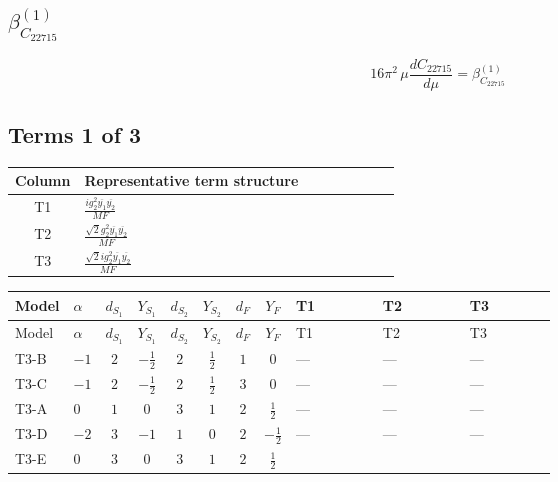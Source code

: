 \documentclass[8pt]{article}
\begin{document}
\begin{landscape}
\section*{$\beta_{C_{22715}}^{(1)}$}
\[16\pi^2\,\mu\frac{d C_{22715}}{d\mu}=\beta_{C_{22715}}^{(1)}\]
\subsection*{Terms 1 of 3}
\begin{center}
\begin{tabular}{@{}c >{\raggedright\arraybackslash}p{0.82\linewidth}@{}}
\toprule
Column & Representative term structure \\
\midrule
T1 & \(\displaystyle \frac{i g_{2}^{2} \overline{y_{1}} \overline{y_{2}}}{MF}\) \\
\midrule
T2 & \(\displaystyle \frac{\sqrt{2} g_{2}^{2} \overline{y_{1}} \overline{y_{2}}}{MF}\) \\
\midrule
T3 & \(\displaystyle \frac{\sqrt{2} i g_{2}^{2} \overline{y_{1}} \overline{y_{2}}}{MF}\) \\
\midrule
\bottomrule
\end{tabular}
\end{center}
\smallskip
\tiny
\begin{longtable}{@{}llcccccc >{\raggedright\arraybackslash}p{0.21\linewidth} >{\raggedright\arraybackslash}p{0.21\linewidth} >{\raggedright\arraybackslash}p{0.21\linewidth}@{}}
\toprule
Model & $\alpha$ & $d_{S_1}$ & $Y_{S_1}$ & $d_{S_2}$ & $Y_{S_2}$ & $d_F$ & $Y_F$ & T1 & T2 & T3 \\
\midrule
\endfirsthead
\toprule
Model & $\alpha$ & $d_{S_1}$ & $Y_{S_1}$ & $d_{S_2}$ & $Y_{S_2}$ & $d_F$ & $Y_F$ & T1 & T2 & T3 \\
\midrule
\endhead
T3-B & $-1$ & $2$ & $-\frac{1}{2}$ & $2$ & $\frac{1}{2}$ & $1$ & $0$ & --- & --- & --- \\
\midrule
T3-C & $-1$ & $2$ & $-\frac{1}{2}$ & $2$ & $\frac{1}{2}$ & $3$ & $0$ & --- & --- & --- \\
\midrule
T3-A & $0$ & $1$ & $0$ & $3$ & $1$ & $2$ & $\frac{1}{2}$ & --- & --- & --- \\
\midrule
T3-D & $-2$ & $3$ & $-1$ & $1$ & $0$ & $2$ & $-\frac{1}{2}$ & --- & --- & --- \\
\midrule
T3-E & $0$ & $3$ & $0$ & $3$ & $1$ & $2$ & $\frac{1}{2}$ & \scriptsize\adjustbox{max width=\linewidth}{$\begin{gathered} - \frac{i g_{2}^{2} \overline{y_{1}} \overline{y_{2}}}{MF}\end{gathered}$} & \scriptsize\adjustbox{max width=\linewidth}{$\begin{gathered} \frac{\sqrt{2} g_{2}^{2} \overline{y_{1}} \overline{y_{2}}}{4 MF}\end{gathered}$} & \scriptsize\adjustbox{max width=\linewidth}{$\begin{gathered} - \frac{49 \sqrt{2} i g_{2}^{2} \overline{y_{1}} \overline{y_{2}}}{16 MF}\end{gathered}$} \\
\midrule
\bottomrule
\end{longtable}
\clearpage

\end{landscape}
\end{document}
